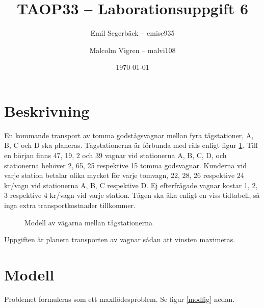 \documentclass[a4paper,titlepage,12pt]{article}
\author{Emil Segerbäck -- emise935
    \and
    Malcolm Vigren -- malvi108
    }
\title{\textbf{TAOP33 -- Laborationsuppgift 6}}
\date{\today}
\begin{document}
	\maketitle
	\newpage
\section*{Beskrivning}
En kommande transport av tomma godstågsvagnar mellan fyra tågstationer, A, B, C
och D ska planeras. Tågstationerna är förbunda med räls enligt figur \ref{trackfig}.
Till en början finns 47, 19, 2 och 39 vagnar vid stationerna A, B, C, D, och
stationerna behöver 2, 65, 25 respektive 15 tomma godsvagnar. Kunderna vid
varje station betalar olika mycket för varje tomvagn, 22, 28, 26 respektive 24
kr/vagn vid stationerna A, B, C respektive D. Ej efterfrågade vagnar kostar 1,
2, 3 respektive 4 kr/vagn vid varje station. Tågen ska åka enligt en viss
tidtabell, så inga extra transportkostnader tillkommer.
\begin{figure}[h]
    \begin{centering}
        \caption{Modell av vägarna mellan tågstationerna\label{trackfig}}
    \end{centering}
\end{figure}
Uppgiften är planera transporten av vagnar sådan att vinsten maximeras.

\section*{Modell}
Problemet formuleras som ett maxflödesproblem. Se figur \ref{modfig} nedan.
\end{document}
